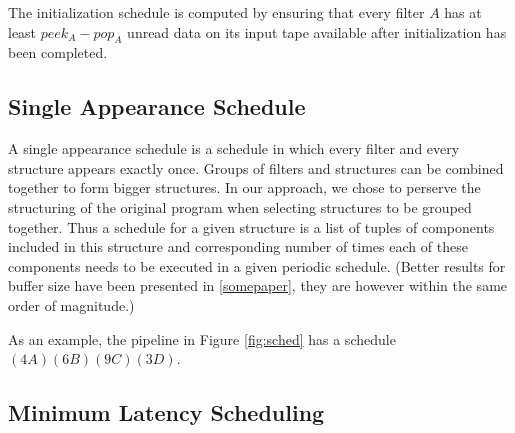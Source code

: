 The initialization schedule is computed by ensuring that every filter $A$ has
at least $peek_A - pop_A$ unread data on its input tape available after 
initialization has been completed.

\subsection{Single Appearance Schedule}

A single appearance schedule is a schedule in which every filter and every
structure appears exactly once.  Groups of filters and structures can be
combined together to form bigger structures.  In our approach, we chose to
perserve the structuring of the original program when selecting structures
to be grouped together.  Thus a schedule for a given structure is a list
of tuples of components included in this structure and corresponding number
of times each of these components needs to be executed in a given periodic
schedule. (Better results for buffer size have been presented in 
\ref{somepaper}, they are however within the same order of magnitude.)

As an example, the pipeline in Figure \ref{fig:sched} has a schedule
$(4A)(6B)(9C)(3D)$.

\subsection{Minimum Latency Scheduling}



